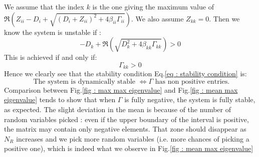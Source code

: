 \documentclass[12pt, titlepage]{report}
\begin{document}
		We assume that the index $k$ is the one giving the maximum value of $\Re\left(Z_{ii}-D_i + \sqrt{\left(D_i+Z_{ii}\right)^2 + 4 \beta_{ii} \Gamma_{ii}}\right)$.
		We also assume $Z_{kk}=0$. Then we know the system is unstable if :
		\begin{equation}
			-D_{k}+\Re\left(\sqrt{D_k^2+ 4 \beta_{kk} \Gamma_{kk}}\right) > 0
		\end{equation}
		This is achieved if and only if:
		\begin{equation}
			\Gamma_{kk} > 0
		\end{equation}
		Hence we clearly see that the stability condition Eq.\eqref{eq : stability condition} is:
		\begin{equation}
			\text{ The system is dynamically stable } \iff \Gamma \text{ has non positive entries.}
		\end{equation}
		Comparison between Fig.\ref{fig : max max eigenvalue} and Fig.\ref{fig : mean max eigenvalue} tends to show that when $\Gamma$ is fully negative, the system is fully stable, as expected. The slight deviation in the mean is because of the number of random variables picked : even if the upper boundary of the interval is positive, the matrix may contain only negative elements. That zone should disappear as $N_R$ increases and we pick more random variables (i.e. more chances of picking a positive one), which is indeed what we observe in Fig.\ref{fig : mean max eigenvalue}
\end{document}
